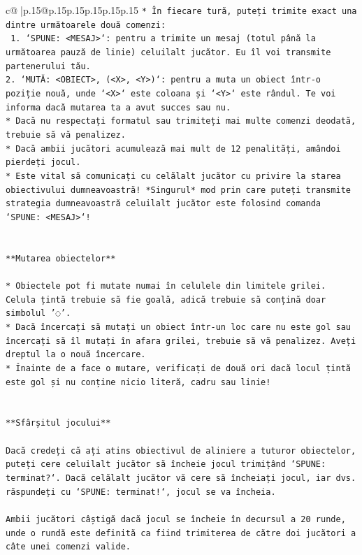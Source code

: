 \documentclass{article}
\begin{document}
{\begin{supertabular}{c@{$\;$}|p{.15\linewidth}@{}p{.15\linewidth}p{.15\linewidth}p{.15\linewidth}p{.15\linewidth}p{.15\linewidth}}
{{{\texttt{* În fiecare tură, puteți trimite exact una dintre următoarele două comenzi:} \\
\texttt{ 1. `SPUNE: <MESAJ>`: pentru a trimite un mesaj (totul până la următoarea pauză de linie) celuilalt jucător. Eu îl voi transmite partenerului tău.} \\
\texttt{2. `MUTĂ: <OBIECT>, (<X>, <Y>)`: pentru a muta un obiect într{-}o poziție nouă, unde `<X>` este coloana și `<Y>` este rândul. Te voi informa dacă mutarea ta a avut succes sau nu.} \\
\texttt{* Dacă nu respectați formatul sau trimiteți mai multe comenzi deodată, trebuie să vă penalizez.} \\
\texttt{* Dacă ambii jucători acumulează mai mult de 12 penalități, amândoi pierdeți jocul.} \\
\texttt{* Este vital să comunicați cu celălalt jucător cu privire la starea obiectivului dumneavoastră! *Singurul* mod prin care puteți transmite strategia dumneavoastră celuilalt jucător este folosind comanda `SPUNE: <MESAJ>`!} \\
\\ 
\\ 
\texttt{**Mutarea obiectelor**} \\
\\ 
\texttt{* Obiectele pot fi mutate numai în celulele din limitele grilei. Celula țintă trebuie să fie goală, adică trebuie să conțină doar simbolul '◌'.} \\
\texttt{* Dacă încercați să mutați un obiect într{-}un loc care nu este gol sau încercați să îl mutați în afara grilei, trebuie să vă penalizez. Aveți dreptul la o nouă încercare.} \\
\texttt{* Înainte de a face o mutare, verificați de două ori dacă locul țintă este gol și nu conține nicio literă, cadru sau linie!} \\
\\ 
\\ 
\texttt{**Sfârșitul jocului**} \\
\\ 
\texttt{Dacă credeți că ați atins obiectivul de aliniere a tuturor obiectelor, puteți cere celuilalt jucător să încheie jocul trimițând `SPUNE: terminat?`. Dacă celălalt jucător vă cere să încheiați jocul, iar dvs. răspundeți cu `SPUNE: terminat!`, jocul se va încheia.} \\
\\ 
\texttt{Ambii jucători câștigă dacă jocul se încheie în decursul a 20 runde, unde o rundă este definită ca fiind trimiterea de către doi jucători a câte unei comenzi valide.} \\
}}}
\end{supertabular}}
\end{document}
